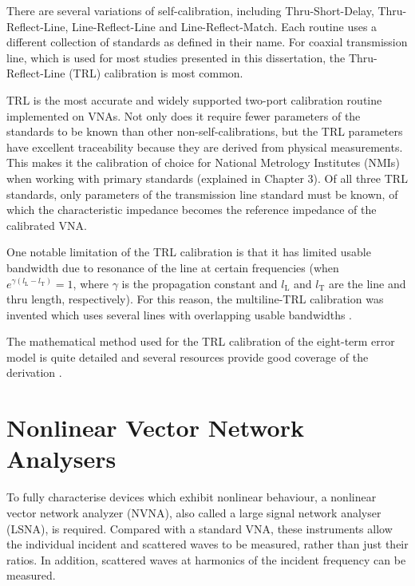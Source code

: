 \documentclass[../thesis/thesis.tex]{subfiles}
\begin{document}
There are several variations of self-calibration, including Thru-Short-Delay, Thru-Reflect-Line, Line-Reflect-Line and Line-Reflect-Match. Each routine uses a different collection of standards as defined in their name. For coaxial transmission line, which is used for most studies presented in this dissertation, the Thru-Reflect-Line (TRL) calibration is most common.

TRL is the most accurate and widely supported two-port calibration routine implemented on VNAs. Not only does it require fewer parameters of the standards to be known than other non-self-calibrations, but the TRL parameters have excellent traceability because they are derived from physical measurements. This makes it the calibration of choice for National Metrology Institutes (NMIs) when working with primary standards (explained in Chapter 3). Of all three TRL standards, only parameters of the transmission line standard must be known, of which the characteristic impedance becomes the reference impedance of the calibrated VNA.

One notable limitation of the TRL calibration is that it has limited usable bandwidth due to resonance of the line at certain frequencies (when $e^{\gamma(l_\textrm{L}-l_\textrm{T})}=1$, where $\gamma$ is the propagation constant and $l_\textrm{L}$ and $l_\textrm{T}$ are the line and thru length, respectively). For this reason, the multiline-TRL calibration was invented which uses several lines with overlapping usable bandwidths \cite{Marks_1991}.

The mathematical method used for the TRL calibration of the eight-term error model is quite detailed and several resources provide good coverage of the derivation \cite{Engen_1979, Teppati_2013}.

\section{Nonlinear Vector Network Analysers}

To fully characterise devices which exhibit nonlinear behaviour, a nonlinear vector network analyzer (NVNA), also called a large signal network analyser (LSNA), is required. Compared with a standard VNA, these instruments allow the individual incident and scattered waves to be measured, rather than just their ratios. In addition, scattered waves at harmonics of the incident frequency can be measured.
\end{document}
